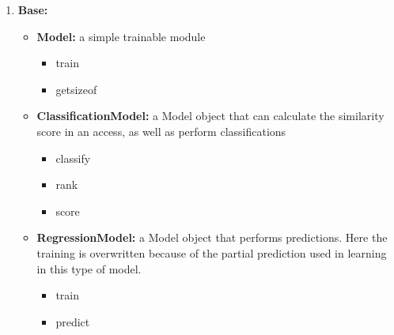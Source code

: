 \documentclass[12pt]{article}
\begin{document}
\begin{enumerate}
    \item \textbf{Base:}

          \begin{itemize}
              \item \textbf{Model:} a simple trainable module
                    \begin{itemize}
                        \item train
                        \item getsizeof
                    \end{itemize}
              \item \textbf{ClassificationModel:} a Model object that can calculate the similarity score in an access, as well as perform classifications
                    \begin{itemize}
                        \item classify
                        \item rank
                        \item score
                    \end{itemize}
              \item \textbf{RegressionModel:} a Model object that performs predictions. Here the training is overwritten because of the partial prediction used in learning in this type of model.
                    \begin{itemize}
                        \item train
                        \item predict
                    \end{itemize}
          \end{itemize}


\end{enumerate}
\end{document}
